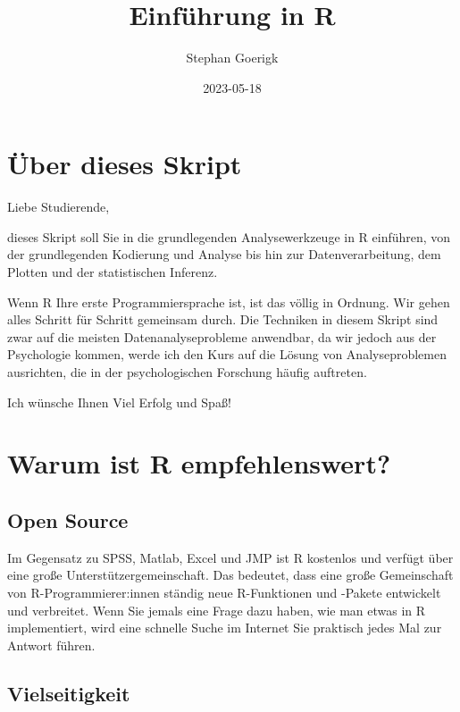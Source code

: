 \documentclass[
]{book}
\title{Einführung in R}
\author{Stephan Goerigk}
\date{2023-05-18}
\begin{document}
\maketitle

{
\setcounter{tocdepth}{1}
\tableofcontents
}
\hypertarget{uxfcber-dieses-skript}{%
\chapter*{Über dieses Skript}\label{uxfcber-dieses-skript}}

Liebe Studierende,

dieses Skript soll Sie in die grundlegenden Analysewerkzeuge in R einführen, von der grundlegenden Kodierung und Analyse bis hin zur Datenverarbeitung, dem Plotten und der statistischen Inferenz.

Wenn R Ihre erste Programmiersprache ist, ist das völlig in Ordnung. Wir gehen alles Schritt für Schritt gemeinsam durch. Die Techniken in diesem Skript sind zwar auf die meisten Datenanalyseprobleme anwendbar, da wir jedoch aus der Psychologie kommen, werde ich den Kurs auf die Lösung von Analyseproblemen ausrichten, die in der psychologischen Forschung häufig auftreten.

Ich wünsche Ihnen Viel Erfolg und Spaß!

\hypertarget{warum-ist-r-empfehlenswert}{%
\chapter{Warum ist R empfehlenswert?}\label{warum-ist-r-empfehlenswert}}

\hypertarget{open-source}{%
\section{Open Source}\label{open-source}}

Im Gegensatz zu SPSS, Matlab, Excel und JMP ist R kostenlos und verfügt über eine große Unterstützergemeinschaft. Das bedeutet, dass eine große Gemeinschaft von R-Programmierer:innen ständig neue R-Funktionen und -Pakete entwickelt und verbreitet. Wenn Sie jemals eine Frage dazu haben, wie man etwas in R implementiert, wird eine schnelle Suche im Internet Sie praktisch jedes Mal zur Antwort führen.

\hypertarget{vielseitigkeit}{%
\section{Vielseitigkeit}\label{vielseitigkeit}}
\end{document}
